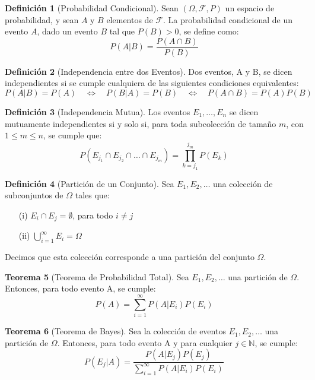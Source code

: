 \documentclass[11pt]{article}
\theoremstyle{definition} %
\newtheorem{theorem}{Teorema}[section]
\newtheorem{definition}[theorem]{Definición}
\begin{document}
\begin{definition}[Probabilidad Condicional]
Sean $(\Omega, \mathcal{F}, P)$ un espacio de probabilidad, y sean $A$ y $B$ elementos de $\mathcal{F}$. La probabilidad condicional de un evento $A$, dado un evento $B$ tal que $P(B) > 0$, se define como:
$$ P(A|B) = \frac{P(A \cap B)}{P(B)} $$
\end{definition}

\begin{definition}[Independencia entre dos Eventos]
Dos eventos, A y B, se dicen independientes si se cumple cualquiera de las siguientes condiciones equivalentes:
$$ P(A|B) = P(A) \quad \Leftrightarrow \quad P(B|A) = P(B) \quad \Leftrightarrow \quad P(A \cap B) = P(A)P(B) $$
\end{definition}

\begin{definition}[Independencia Mutua]
Los eventos $E_{1}, \dots, E_{n}$ se dicen mutuamente independientes si y solo si, para toda subcolección de tamaño $m$, con $1 \le m \le n$, se cumple que:
$$ P(E_{j_{1}} \cap E_{j_{2}} \cap \dots \cap E_{j_{m}}) = \prod_{k=j_{1}}^{j_{m}} P(E_{k}) $$
\end{definition}

\begin{definition}[Partición de un Conjunto]
Sea $E_{1}, E_{2}, \dots$ una colección de subconjuntos de $\Omega$ tales que:
\begin{enumerate}
    \item[(i)] $E_{i} \cap E_{j} = \emptyset$, para todo $i \ne j$
    \item[(ii)] $\bigcup_{i=1}^{\infty} E_{i} = \Omega$
\end{enumerate}
Decimos que esta colección corresponde a una partición del conjunto $\Omega$.
\end{definition}

\begin{theorem}[Teorema de Probabilidad Total]
Sea $E_{1}, E_{2}, \dots$ una partición de $\Omega$. Entonces, para todo evento A, se cumple:
$$ P(A) = \sum_{i=1}^{\infty} P(A|E_{i})P(E_{i}) $$
\end{theorem}

\begin{theorem}[Teorema de Bayes]
Sea la colección de eventos $E_{1}, E_{2}, \dots$ una partición de $\Omega$. Entonces, para todo evento A y para cualquier $j \in \mathbb{N}$, se cumple:
$$ P(E_{j}|A) = \frac{P(A|E_{j})P(E_{j})}{\sum_{i=1}^{\infty} P(A|E_{i})P(E_{i})} $$
\end{theorem}
\end{document}
